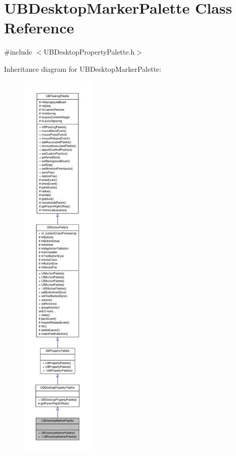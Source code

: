 \hypertarget{class_u_b_desktop_marker_palette}{\section{U\-B\-Desktop\-Marker\-Palette Class Reference}
\label{dc/d7b/class_u_b_desktop_marker_palette}
}


{\ttfamily \#include $<$U\-B\-Desktop\-Property\-Palette.\-h$>$}



Inheritance diagram for U\-B\-Desktop\-Marker\-Palette\-:
\nopagebreak
\begin{figure}[H]
\begin{center}
\leavevmode
\includegraphics[height=550pt]{dc/dfe/class_u_b_desktop_marker_palette__inherit__graph}
\end{center}
\end{figure}


